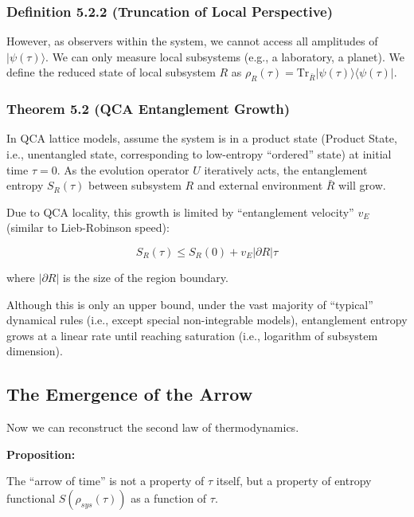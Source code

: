 \documentclass[11pt,a4paper,twoside]{book}
\begin{document}
\subsubsection{Definition 5.2.2 (Truncation of Local Perspective)}

However, as observers within the system, we cannot access all amplitudes of $|\psi(\tau)\rangle$. We can only measure local subsystems (e.g., a laboratory, a planet). We define the reduced state of local subsystem $R$ as $\rho_R(\tau) = \text{Tr}_{\bar{R}} |\psi(\tau)\rangle\langle\psi(\tau)|$.

\subsubsection{Theorem 5.2 (QCA Entanglement Growth)}

In QCA lattice models, assume the system is in a product state (Product State, i.e., unentangled state, corresponding to low-entropy ``ordered'' state) at initial time $\tau=0$. As the evolution operator $U$ iteratively acts, the entanglement entropy $S_R(\tau)$ between subsystem $R$ and external environment $\bar{R}$ will grow.

Due to QCA locality, this growth is limited by ``entanglement velocity'' $v_E$ (similar to Lieb-Robinson speed):

$$S_R(\tau) \le S_R(0) + v_E |\partial R| \tau$$

where $|\partial R|$ is the size of the region boundary.

Although this is only an upper bound, under the vast majority of ``typical'' dynamical rules (i.e., except special non-integrable models), entanglement entropy grows at a linear rate until reaching saturation (i.e., logarithm of subsystem dimension).

\subsection{The Emergence of the Arrow}

Now we can reconstruct the second law of thermodynamics.

\textbf{Proposition:}

The ``arrow of time'' is not a property of $\tau$ itself, but a property of entropy functional $S(\rho_{sys}(\tau))$ as a function of $\tau$.
\end{document}
